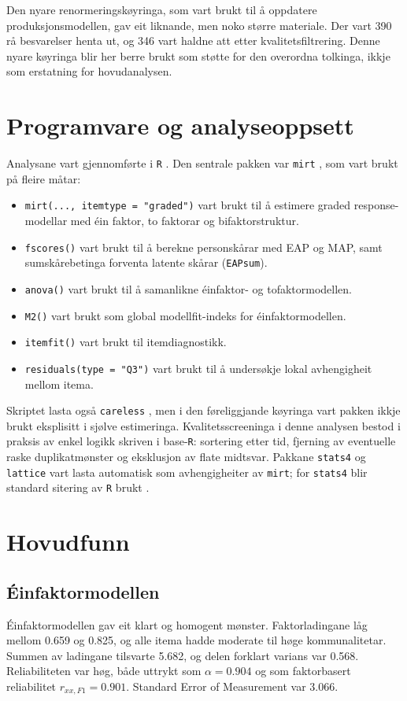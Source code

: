 \documentclass[11pt,a4paper]{article}
\begin{document}
Den nyare renormeringskøyringa, som vart brukt til å oppdatere produksjonsmodellen, gav eit liknande, men noko større materiale. Der vart 390 rå besvarelser henta ut, og 346 vart haldne att etter kvalitetsfiltrering. Denne nyare køyringa blir her berre brukt som støtte for den overordna tolkinga, ikkje som erstatning for hovudanalysen.

\section{Programvare og analyseoppsett}
Analysane vart gjennomførte i \texttt{R} \parencite{RCore2026}. Den sentrale pakken var \texttt{mirt} \parencite{Chalmers2012mirt}, som vart brukt på fleire måtar:

\begin{itemize}
\item \texttt{mirt(..., itemtype = "graded")} vart brukt til å estimere graded response-modellar med éin faktor, to faktorar og bifaktorstruktur.
\item \texttt{fscores()} vart brukt til å berekne personskårar med EAP og MAP, samt sumskårebetinga forventa latente skårar (\texttt{EAPsum}).
\item \texttt{anova()} vart brukt til å samanlikne éinfaktor- og tofaktormodellen.
\item \texttt{M2()} vart brukt som global modellfit-indeks for éinfaktormodellen.
\item \texttt{itemfit()} vart brukt til itemdiagnostikk.
\item \texttt{residuals(type = "Q3")} vart brukt til å undersøkje lokal avhengigheit mellom itema.
\end{itemize}

Skriptet lasta også \texttt{careless} \parencite{YentesWilhelm2023careless}, men i den føreliggjande køyringa vart pakken ikkje brukt eksplisitt i sjølve estimeringa. Kvalitetsscreeninga i denne analysen bestod i praksis av enkel logikk skriven i base-\texttt{R}: sortering etter tid, fjerning av eventuelle raske duplikatmønster og eksklusjon av flate midtsvar. Pakkane \texttt{stats4} og \texttt{lattice} \parencite{Sarkar2008lattice} vart lasta automatisk som avhengigheiter av \texttt{mirt}; for \texttt{stats4} blir standard sitering av \texttt{R} brukt \parencite{RCore2026}.

\section{Hovudfunn}
\subsection{Éinfaktormodellen}
Éinfaktormodellen gav eit klart og homogent mønster. Faktorladingane låg mellom 0.659 og 0.825, og alle itema hadde moderate til høge kommunalitetar. Summen av ladingane tilsvarte 5.682, og delen forklart varians var 0.568. Reliabiliteten var høg, både uttrykt som $\alpha = 0.904$ og som faktorbasert reliabilitet $r_{xx,F1} = 0.901$. Standard Error of Measurement var 3.066.
\end{document}
